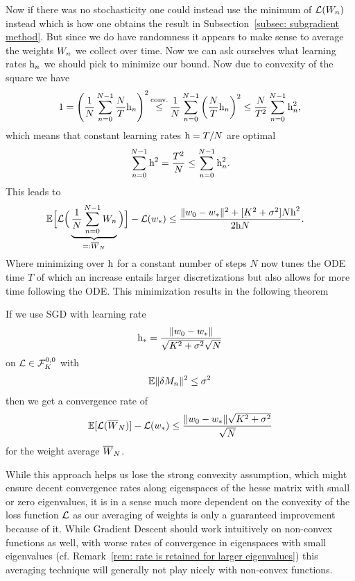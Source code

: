 Now if there was no stochasticity one could instead use the minimum of
\(\Loss(\Weights_n)\) instead which is how one obtains the result in
Subsection~\ref{subsec: subgradient method}. But since we do have randomness
it appears to make sense to average the weights \(\Weights_n\) we collect over
time.
Now we can ask ourselves what learning rates \(\lr_n\) we should pick to
minimize our bound. Now due to convexity of the square we have
\begin{align*}
	1 = \left(\frac{1}{N}\sum_{n=0}^{N-1}\frac{N}{T}\lr_n\right)^2
	\xle{\text{conv.}} \frac{1}{N}\sum_{n=0}^{N-1}\left(\frac{N}{T}\lr_n\right)^2
	\le \frac{N}{T^2}\sum_{n=0}^{N-1}\lr_n^2,
\end{align*}
which means that constant learning rates \(\lr=T/N\) are optimal
\begin{align*}
	\sum_{n=0}^{N-1}\lr^2 = \frac{T^2}{N} \le \sum_{n=0}^{N-1}\lr_n^2.
\end{align*}
This leads to
\begin{align*}
	\E\Big[
		\Loss\Big(\underbrace{
			\frac{1}{N}\sum_{n=0}^{N-1}\Weights_n
		}_{=:\overline{\Weights}_N}\Big)
	\Big]-\Loss(\minimum)
	&\le \frac{
		\|\weights_0 - \minimum\|^2 + [\lipConst^2+\stdBound^2]N\lr^2
	}{2\lr N}.
\end{align*}
Where minimizing over \(\lr\) for a constant number of steps \(N\) now tunes the
ODE time \(T\) of which an increase entails larger discretizations but also
allows for more time following the ODE.
This minimization results in the following theorem
\begin{theorem}\label{thm: optimal averaging rates}
	If we use SGD with learning rate
	\begin{align*}
		\lr_* = \frac{\|\weights_0-\minimum\|}{\sqrt{\lipConst^2+\stdBound^2}\sqrt{N}}
	\end{align*}
	on \(\Loss\in\lipGradientSet[0,0]{\lipConst}\) with
	\begin{align*}
		\E\|\martIncr_n\|^2 \le \stdBound^2	
	\end{align*}
	then we get a convergence rate of
	\begin{align*}
		\E[\Loss(\overline{\Weights}_N)] -\Loss(\minimum)
		\le \frac{\|\weights_0-\minimum\|\sqrt{\lipConst^2+\stdBound^2}}{\sqrt{N}}
	\end{align*}
	for the weight average \(\overline{\Weights}_N\).
\end{theorem}

While this approach helps us lose the strong convexity assumption, which might
ensure decent convergence rates along eigenspaces of the hesse matrix with
small or zero eigenvalues, it is in a sense much more dependent on the convexity
of the loss function \(\Loss\) as our averaging of weights is only a
guaranteed improvement because of it. While Gradient Descent should work
intuitively on non-convex functions as well, with worse rates of convergence in
eigenspaces with small eigenvalues (cf. Remark~\ref{rem: rate is retained for
larger eigenvalues}) this averaging technique will generally not play nicely
with non-convex functions.

